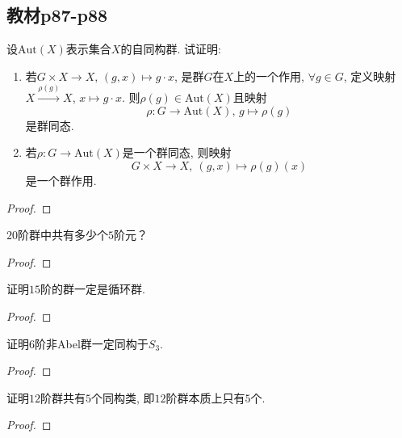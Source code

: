 \subsection{教材p87-p88}

\begin{problem}
    设$\mathrm{Aut}(X)$表示集合$X$的自同构群. 试证明: 
\begin{enumerate}[(1)]
    \item 若$G \times X \to X,\, (g, x) \mapsto g \cdot x$,
是群$G$在$X$上的一个作用, $\forall g \in G$, 定义映射
$X \xrightarrow{\rho(g)} X$, $x \mapsto g \cdot x$.
则$\rho(g) \in \mathrm{Aut}(X)$且映射
\[
    \rho:G \to \mathrm{Aut}(X),\, g \mapsto \rho(g)
\]
是群同态.
    \item 若$\rho:G \to \mathrm{Aut}(X)$是一个群同态, 则映射
\[
    G \times X \to X,\: (g, x) \mapsto \rho(g)(x)
\]
是一个群作用.
\end{enumerate}
\end{problem}

\begin{proof}
    
\end{proof}

\begin{problem}
    $20$阶群中共有多少个$5$阶元？
\end{problem}

\begin{proof}
    
\end{proof}

\begin{problem}
    证明$15$阶的群一定是循环群.
\end{problem}

\begin{proof}
    
\end{proof}

\begin{problem}
    证明$6$阶非Abel群一定同构于$S_3$.
\end{problem}

\begin{proof}
    
\end{proof}

\begin{problem}
    证明$12$阶群共有$5$个同构类, 即$12$阶群本质上只有$5$个.
\end{problem}

\begin{proof}
    
\end{proof}


